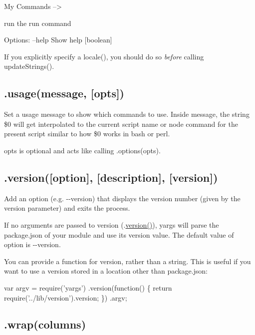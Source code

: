 \begin{DoxyCode}
My Commands -->

  run  the run command

Options:
  --help  Show help  [boolean]
\end{DoxyCode}


If you explicitly specify a {\ttfamily locale()}, you should do so {\itshape before} calling {\ttfamily update\+Strings()}.

\subsection*{.usage(message, \mbox{[}opts\mbox{]}) }

Set a usage message to show which commands to use. Inside {\ttfamily message}, the string {\ttfamily \$0} will get interpolated to the current script name or node command for the present script similar to how {\ttfamily \$0} works in bash or perl.

{\ttfamily opts} is optional and acts like calling {\ttfamily .options(opts)}.

\subsection*{\label{_version}%
.version(\mbox{[}option\mbox{]}, \mbox{[}description\mbox{]}, \mbox{[}version\mbox{]}) }

Add an option (e.\+g. {\ttfamily -\/-\/version}) that displays the version number (given by the {\ttfamily version} parameter) and exits the process.

If no arguments are passed to {\ttfamily version} ({\ttfamily .\mbox{\hyperlink{namespacesetup_a2aa722b36a933088812b50ea79b97a5c}{version()}}}), yargs will parse the {\ttfamily package.\+json} of your module and use its {\ttfamily version} value. The default value of {\ttfamily option} is {\ttfamily -\/-\/version}.

You can provide a {\ttfamily function} for version, rather than a string. This is useful if you want to use a version stored in a location other than package.\+json\+:


\begin{DoxyCode}
var argv = require('yargs')
  .version(function() \{
    return require('../lib/version').version;
  \})
  .argv;
\end{DoxyCode}


\subsection*{\label{_wrap}%
.wrap(columns) }

